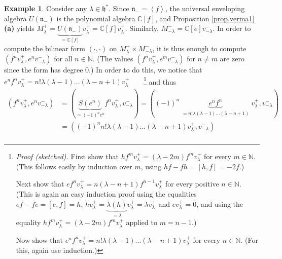 \documentclass
[numbers=enddot,12pt,final,onecolumn,german,notitlepage]{scrartcl}%
\theoremstyle{definition}
\newtheorem{example}[theo]{Example}
\begin{document}
\begin{example}
Consider any $\lambda\in\mathfrak{h}^{\ast}$. Since $\mathfrak{n}%
_{-}=\left\langle f\right\rangle $, the universal enveloping algebra $U\left(
\mathfrak{n}_{-}\right)  $ is the polynomial algebra $\mathbb{C}\left[
f\right]  $, and Proposition \ref{prop.verma1} \textbf{(a)} yields
$M_{\lambda}^{+}=\underbrace{U\left(  \mathfrak{n}_{-}\right)  }%
_{=\mathbb{C}\left[  f\right]  }v_{\lambda}^{+}=\mathbb{C}\left[  f\right]
v_{\lambda}^{+}$. Similarly, $M_{-\lambda}^{-}=\mathbb{C}\left[  e\right]
v_{-\lambda}^{-}$. In order to compute the bilinear form $\left(  \cdot
,\cdot\right)  $ on $M_{\lambda}^{+}\times M_{-\lambda}^{-}$, it is thus
enough to compute $\left(  f^{n}v_{\lambda}^{+},e^{n}v_{-\lambda}^{-}\right)
$ for all $n\in\mathbb{N}$. (The values $\left(  f^{n}v_{\lambda}^{+}%
,e^{m}v_{-\lambda}^{-}\right)  $ for $n\neq m$ are zero since the form has
degree $0$.) In order to do this, we notice that $e^{n}f^{n}v_{\lambda}%
^{+}=n!\lambda\left(  \lambda-1\right)  ...\left(  \lambda-n+1\right)
v_{\lambda}^{+}$\ \ \ \ \footnote{\textit{Proof (sketched).} First show that
$hf^{m}v_{\lambda}^{+}=\left(  \lambda-2m\right)  f^{m}v_{\lambda}^{+}$ for
every $m\in\mathbb{N}$. (This follows easily by induction over $m$, using
$hf-fh=\left[  h,f\right]  =-2f$.)
\par
Next show that $ef^{n}v_{\lambda}^{+}=n\left(  \lambda-n+1\right)
f^{n-1}v_{\lambda}^{+}$ for every positive $n\in\mathbb{N}$. (This is again an
easy induction proof using the equalities $ef-fe=\left[  e,f\right]  =h$,
$hv_{\lambda}^{+}=\underbrace{\lambda\left(  h\right)  }_{=\lambda}v_{\lambda
}^{+}=\lambda v_{\lambda}^{+}$ and $ev_{\lambda}^{+}=0$, and using the
equality $hf^{m}v_{\lambda}^{+}=\left(  \lambda-2m\right)  f^{m}v_{\lambda
}^{+}$ applied to $m=n-1$.)
\par
Now show that $e^{n}f^{n}v_{\lambda}^{+}=n!\lambda\left(  \lambda-1\right)
...\left(  \lambda-n+1\right)  v_{\lambda}^{+}$ for every $n\in\mathbb{N}$.
(For this, again use induction.)} and thus%
\begin{align*}
\left(  f^{n}v_{\lambda}^{+},e^{n}v_{-\lambda}^{-}\right)   &  =\left(
\underbrace{S\left(  e^{n}\right)  }_{=\left(  -1\right)  ^{n}e^{n}}%
f^{n}v_{\lambda}^{+},v_{-\lambda}^{-}\right)  =\left(  \left(  -1\right)
^{n}\underbrace{e^{n}f^{n}}_{\substack{=n!\lambda\left(  \lambda-1\right)
...\left(  \lambda-n+1\right)  }}v_{\lambda}^{+},v_{-\lambda}^{-}\right) \\
&  =\left(  \left(  -1\right)  ^{n}n!\lambda\left(  \lambda-1\right)
...\left(  \lambda-n+1\right)  v_{\lambda}^{+},v_{-\lambda}^{-}\right) \\

\end{align*}
\end{example}
\end{document}
